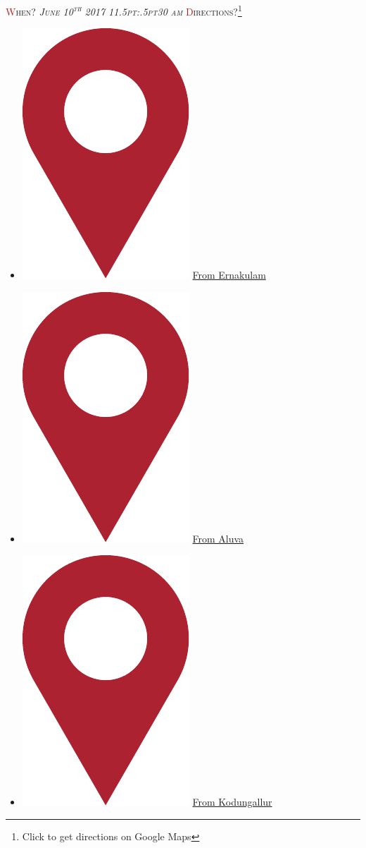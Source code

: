 \documentclass{article}
\newcommand{\h}[1]{\textcolor{FireBrick}{#1}}
\newcommand*{\pin}{%
  \includegraphics[height=\heightof{M}]{pin}%
}
\begin{document}
{\scshape \h{W}hen?}
{\small \emph \textit{%
  \scshape June 10\/\rlap{,}\textsuperscript{th} 2017
  11\kern.5pt:\kern.5pt30 am
}}
\medbreak
{\scshape \h{D}irections?}\footnote{Click to get directions on Google Maps}
\begin{itemize}
	\item[] {\normalsize \pin} \href{https://www.google.co.in/maps/dir/Mount+Carmel+Church,+Pottakuzhi+-+Mamangalam+Rd,+Mamangalam,+Elamakkara,+Ernakulam,+Kerala+682025/Cherai+Beach+Resorts,+Cherai,+Vypin,+Kerala/@10.0633394,76.1809834,12z/data=!3m1!4b1!4m13!4m12!1m5!1m1!1s0x3b080d0fa96af125:0x696a9989e82b6c02!2m2!1d76.3032795!2d10.0093666!1m5!1m1!1s0x3b0810a300000001:0xebdd3e12cda825ee!2m2!1d76.1986595!2d10.1363985}{From Ernakulam}
	\item[] {\normalsize \pin} \href{https://www.google.co.in/maps/dir/Aluva+Railway+Station,+Periyar+Nagar,+Aluva,+Kerala/Cherai+Beach+Resorts,+Cherai,+Vypin,+Kerala/@10.126786,76.2902413,13.25z/data=!4m13!4m12!1m5!1m1!1s0x3b080f29eb7eb615:0xb454e4d93b04846c!2m2!1d76.3567139!2d10.1086654!1m5!1m1!1s0x3b086d34d768e025:0x4fa5702ae301f77f!2m2!1d76.1805941!2d10.1363345}{From Aluva}
	\item[] {\normalsize \pin} \href{https://www.google.co.in/maps/dir/Kodungallur+Bhagavathy+Temple,+Kodungallur,+Kerala/Cherai+Beach+Resorts,+Cherai,+Vypin,+Kerala/@10.1821016,76.1630008,13z/data=!3m1!4b1!4m13!4m12!1m5!1m1!1s0x3b081bf47f4c042f:0x7e6f994f0db02349!2m2!1d76.1984602!2d10.2268941!1m5!1m1!1s0x3b086d34d768e025:0x4fa5702ae301f77f!2m2!1d76.1805941!2d10.1363345}{From Kodungallur}
\end{itemize}
\end{document}

